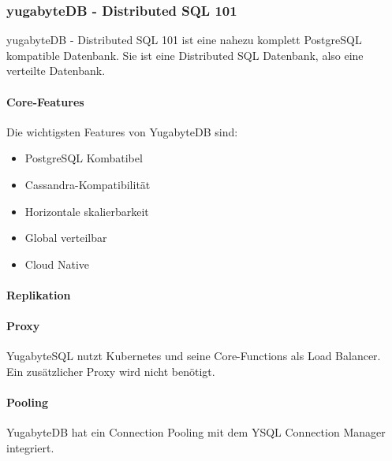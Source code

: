 
\begin{flushleft}
    \subsubsection{yugabyteDB - Distributed SQL 101}
    yugabyteDB - Distributed SQL 101 ist eine nahezu komplett \Gls{PostgreSQL} kompatible Datenbank.
    Sie ist eine Distributed SQL Datenbank, also eine verteilte Datenbank\cite{ZXD6D9KU}.
\end{flushleft}
\begin{flushleft}
    \paragraph{Core-Features}
    Die wichtigsten Features von YugabyteDB sind\cite{N6QKEPAC}:
    \begin{itemize}
        \item PostgreSQL Kombatibel
        \item \Gls{Cassandra}-Kompatibilität
        \item Horizontale skalierbarkeit
        \item Global verteilbar
        \item Cloud Native
    \end{itemize}
\end{flushleft}
\begin{flushleft}
    \paragraph{Replikation}
\end{flushleft}
\begin{flushleft}
    \paragraph{Proxy}
    YugabyteSQL nutzt Kubernetes und seine Core-Functions als Load Balancer.\\
    Ein zusätzlicher Proxy wird nicht benötigt.
\end{flushleft}
\begin{flushleft}
    \paragraph{Pooling}
    YugabyteDB hat ein Connection Pooling mit dem YSQL Connection Manager integriert\cite{2FQ8JXD7}.
\end{flushleft}
